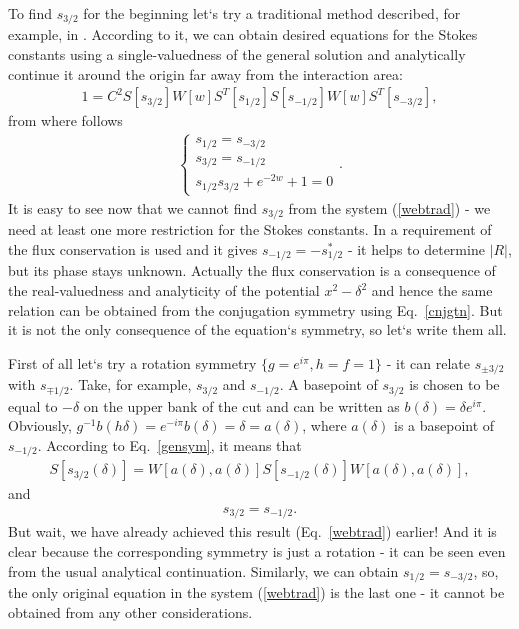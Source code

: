 \documentclass[aps,prl,preprint,superscriptaddress]{revtex4}
\begin{document}
To find $s_{3/2}$ for the beginning let`s try a traditional method described, for example, in \cite{white}. According to it, we can obtain desired equations for the Stokes constants using a single-valuedness of the general solution and analytically continue it around the origin far away from the interaction area:
\begin{eqnarray}
1 = C^2S[s_{3/2}]W[w]S^T[s_{1/2}]S[s_{-1/2}]W[w]S^T[s_{-3/2}],
\label{wgac}
\end{eqnarray}
from where follows
\begin{eqnarray}
\begin{cases} 
s_{1/2} = s_{-3/2}\\
s_{3/2} = s_{-1/2}\\ 
s_{1/2}s_{3/2} + e^{-2w} + 1 = 0
\end{cases}.
\label{webtrad}  
\end{eqnarray}
It is easy to see now that we cannot find $s_{3/2}$ from the system (\ref{webtrad}) - we need at least one more restriction for the Stokes constants. In \cite{white} a requirement of the flux conservation is used and it gives $s_{-1/2}=-s_{1/2}^*$ - it helps to determine $|R|$, but its phase stays unknown. Actually the flux conservation is a consequence of the real-valuedness and analyticity of the potential $x^2-\delta^2$ and hence the same relation can be obtained from the conjugation symmetry using Eq.~\ref{cnjgtn}. But it is not the only consequence of the equation`s symmetry, so let`s write them all.

First of all let`s try a rotation symmetry $\{g=e^{i\pi},h=f=1\}$ - it can relate $s_{\pm 3/2}$ with $s_{\mp 1/2}$. Take, for example, $s_{3/2}$ and $s_{-1/2}$. A basepoint of $s_{3/2}$ is chosen to be equal to $-\delta$ on the upper bank of the cut and can be written as $b(\delta)=\delta e^{i\pi}$. Obviously, $g^{-1}b(h\delta)=e^{-i\pi}b(\delta)=\delta=a(\delta)$, where $a(\delta)$ is a basepoint of $s_{-1/2}$. According to Eq.~\ref{gensym}, it means that
\begin{eqnarray}
S[s_{3/2}(\delta)] = W[a(\delta),a(\delta)]S[s_{-1/2}(\delta)]W[a(\delta),a(\delta)],
\label{webrs1}
\end{eqnarray}
and
\begin{eqnarray}
s_{3/2} = s_{-1/2}.
\label{webrel1}
\end{eqnarray}
But wait, we have already achieved this result (Eq.~\ref{webtrad}) earlier! And it is clear because the corresponding symmetry is just a rotation - it can be seen even from the usual analytical continuation. Similarly, we can obtain $s_{1/2}=s_{-3/2}$, so, the only original equation in the system (\ref{webtrad}) is the last one - it cannot be obtained from any other considerations.
\end{document}
